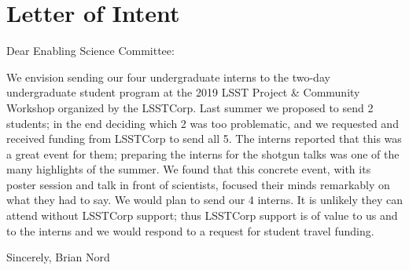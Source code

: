 \section{Letter of Intent}

Dear Enabling Science Committee:

We envision sending our four undergraduate interns to the two-day
undergraduate student program at the 2019 LSST Project \& Community Workshop
organized by the LSSTCorp. Last summer we proposed to send 2 students; in the end
deciding which 2 was too problematic, and we requested and received funding from
LSSTCorp to send all 5. The interns reported that this was a great event
for them; preparing the interns for the shotgun talks was one of the many
highlights of the summer. We found that this concrete event, with its poster session
and talk in front of scientists, focused their minds remarkably on what they had to
say. We would plan to send our 4 interns. It is unlikely they
can attend without LSSTCorp support; thus LSSTCorp support is of value to us and to the
interns and we would respond to a request for student travel funding.

Sincerely,
Brian Nord
